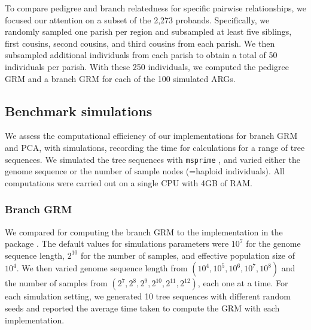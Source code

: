 To compare pedigree and branch relatedness for specific pairwise relationships,
we focused our attention on a subset of the 2,273 probands.
%
Specifically, we randomly sampled one parish per region and
subsampled at least five siblings, first cousins, second cousins, and third cousins from each parish.
%
We then subsampled additional individuals from each parish
to obtain a total of 50 individuals per parish.
%
With these 250 individuals, we computed the pedigree GRM and a branch GRM
for each of the 100 simulated ARGs.

%



\subsection{Benchmark simulations}

We assess the computational efficiency of our implementations for branch GRM and PCA,
with simulations, recording the time for calculations for a range of tree sequences.
%
We simulated the tree sequences with \texttt{msprime} \citep{baumdicker2022efficient},
and varied either the genome sequence or the number of sample nodes (=haploid individuals).
%
All computations were carried out on a single CPU with 4GB of RAM.

\subsubsection{Branch GRM}

We compared \tsGRM{} for computing the branch GRM to
the implementation in the \eGRM{} package \citep{fan2022genealogical}.
%
The default values for simulations parameters were $10^{7}$ for the genome sequence length,
$2^{10}$ for the number of samples, and effective population size of $10^4$.
%
We then varied
genome sequence length from $(10^{4}, 10^{5}, 10^{6}, 10^{7}, 10^{8})$ and
the number of samples from $(2^7, 2^8, 2^9, 2^{10}, 2^{11}, 2^{12})$,
each one at a time.
%
For each simulation setting, we generated 10 tree sequences with different random seeds and
reported the average time taken to compute the GRM with each implementation.

